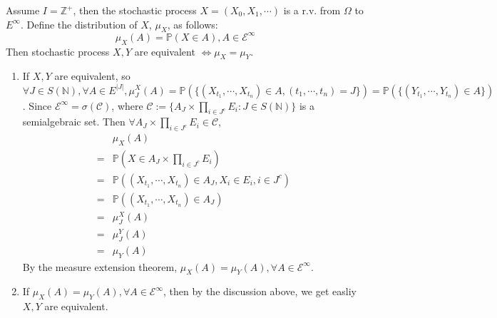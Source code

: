 \documentclass{ctexart}
\begin{document}
\begin{problem}\label{pro:6}
  Assume \(I=\mathbb{Z}^+\), then the stochastic process \(X=(X_0,X_1,\cdots)\) is a r.v. from \(\Omega\) to \(E^\infty\).
  Define the distribution of \(X\), \(\mu_X\), as follows:
  \[
    \mu_X(A)=\mathbb{P}(X \in A),A \in \mathscr{E}^\infty
  \]
  Then stochastic process \(X,Y\) are equivalent \(\iff \mu_X=\mu_Y\).
\end{problem}
\begin{solution}
  \begin{enumerate}
    \item If \(X,Y\) are equivalent, so \(\forall J \in S(\mathbb{N}), \forall A \in E^{|J|},\mu_J^X(A) = \mathbb{P}(\{(X_{t_1},\cdots,X_{t_n}) \in A, (t_1,\cdots,t_n) = J\}) = \mathbb{P}(\{(Y_{t_1},\cdots,Y_{t_n}) \in A\})\).
      Since \(\mathscr{E}^{\infty} = \sigma(\mathscr{C})\), where \(\mathscr{C}:=\{A_J \times \prod_{i \in J^c}E_i: J \in S(\mathbb{N})\}\) is a semialgebraic set.
      Then \(\forall A_J \times \prod_{i \in J^c} E_i \in \mathscr{C}\),
      \begin{equation}
        \begin{aligned}
            & \mu_X(A)                                                             \\
          = & \mathbb{P}(X \in A_J \times \prod_{i \in J^c}E_i)                    \\
          = & \mathbb{P}((X_{t_1},\cdots,X_{t_n}) \in A_J, X_i \in E_i, i \in J^c) \\
          = & \mathbb{P}((X_{t_1},\cdots,X_{t_n}) \in A_J)                         \\
          = & \mu^X_J(A)                                                           \\
          = & \mu^Y_J(A)                                                           \\
          = & \mu_Y(A)
        \end{aligned}
      \end{equation}
      By the measure extension theorem, \(\mu_X(A) = \mu_Y(A), \forall A \in \mathscr{E}^{\infty}\).
    \item If \(\mu_X(A)=\mu_Y(A), \forall A \in \mathscr{E}^{\infty}\), then by the discussion above,
      we get easliy \(X, Y\) are equivalent.
  \end{enumerate}
\end{solution}
\end{document}
